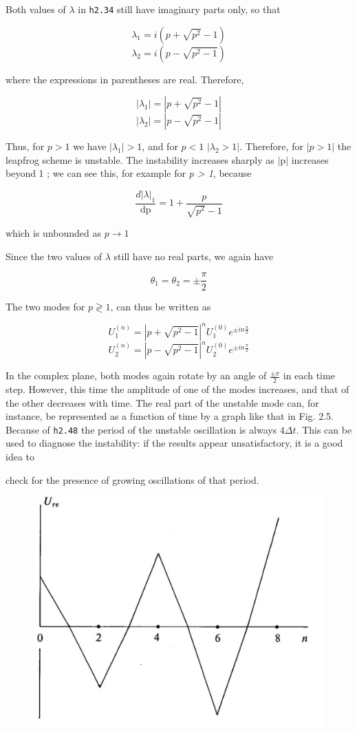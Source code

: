 Both values of \(\lambda\) in \texttt{h2.34} still have imaginary parts
only, so that

\[\lambda_{1} = i\left( p + \sqrt{p^{2}} - 1 \right)\]\[\lambda_{2} = i\left( p - \sqrt{p^{2} - 1} \right)\]

where the expressions in parentheses are real. Therefore,

\[\left| \lambda_{1} \right| = \left| p + \sqrt{p^{2}} - 1 \right|\]\[\left| \lambda_{2} \right| = \left| p - \sqrt{p^{2}} - 1 \right|\]

Thus, for $p > 1$ we have
\(\left| \lambda_{1} \right| > 1\), and for $p< 1$
\(\left| \lambda_{2} > 1 \right|\). Therefore, for
\(\left| p > 1 \right|\) the leapfrog scheme is unstable. The
instability increases sharply as \(\left| \text{p} \right|\) increases
beyond 1 ; we can see this, for example for \emph{p \textgreater{} 1},
because

\[\frac{d\left| \lambda \right|_{1}}{\text{dp}} = 1 + \frac{p}{\sqrt{p^{2}} - 1}\]

which is unbounded as \(p \rightarrow 1\)

Since the two values of \(\lambda\) still have no real parts, we again
have

\[\theta_{1} = \theta_{2} = \pm \frac{\pi}{2}\]

The two modes for \(p \gtrless 1\), can thus be written as

\[U_{1}^{\left( n \right)} = \left| p + \sqrt{p^{2} - 1} \right|^{n}U_{1}^{\left( 0 \right)}e^{\pm in\frac{\pi}{2}}\]\[U_{2}^{\left( n \right)} = \left| p - \sqrt{p^{2} - 1} \right|^{n}U_{2}^{\left( 0 \right)}e^{\pm in\frac{\pi}{2}}\]

In the complex plane, both modes again rotate by an angle of
\(\frac{\pm \pi}{2}\) in each time step. However, this time the
amplitude of one of the modes increases, and that of the other decreases
with time. The real part of the unstable mode can, for instance, be
represented as a function of time by a graph like that in Fig. 2.5.
Because of \texttt{h2.48} the period of the unstable oscillation is
always \(4\Delta t\). This can be used to diagnose the instability: if
the results appear unsatisfactory, it is a good idea to

check for the presence of growing oscillations of that period.

\begin{figure}
    \centering
    \includegraphics[width = .7 \textwidth]{figs/NM/pic9.jpg}
    \caption{} \label{fig:}
\end{figure}

